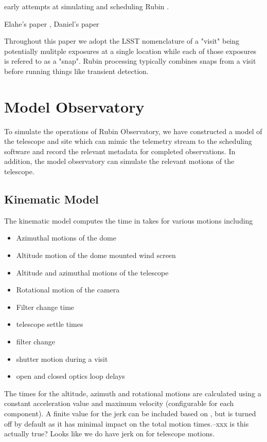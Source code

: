 \documentclass[]{aastex631}
\begin{document}
early attempts at simulating and scheduling Rubin \citet{Delgado2014, Delgado2016SPIE}.

Elahe's paper \citet{Naghib2019}, Daniel's paper \citep{Rothchild2019}

Throughout this paper we adopt the LSST nomenclature of a "visit" being potentially mulitple exposures at a single location while each of those exposures is refered to as a "snap". Rubin processing typically combines snaps from a visit before running things like transient detection.

\section{Model Observatory}\label{sec:model_obs}

To simulate the operations of Rubin Observatory, we have constructed a model of the telescope and site which can mimic the telemetry stream to the scheduling software and record the relevant metadata for completed observations. In addition, the model observatory can simulate the relevant motions of the telescope.

\subsection{Kinematic Model}
The kinematic model computes the time in takes for various motions including
\begin{itemize}
    \item{Azimuthal motions of the dome}
    \item{Altitude motion of the dome mounted wind screen}
    \item{Altitude and azimuthal motions of the telescope}
    \item{Rotational motion of the camera}
    \item{Filter change time}
    \item{telescope settle times}
    \item{filter change}
    \item{shutter motion during a visit}
    \item{open and closed optics loop delays}
\end{itemize}

The times for the altitude, azimuth and rotational motions are calculated using a constant acceleration value and maximum velocity (configurable for each component). A finite value for the jerk can be included based on \citet{Mu2009}, but is turned off by default as it has minimal impact on the total motion times.--xxx is this actually true? Looks like we do have jerk on for telescope motions.
\end{document}

